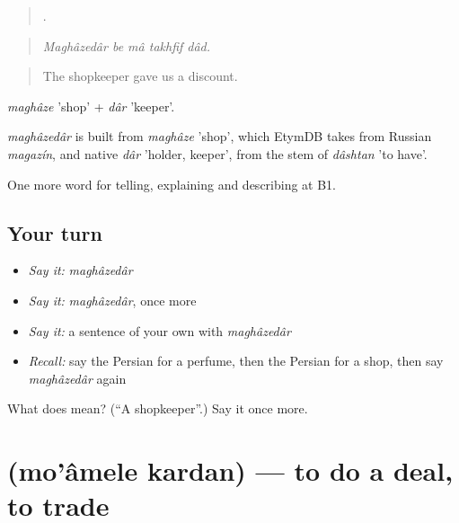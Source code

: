 \begin{quote}
     .
\end{quote}

\begin{quote}
\emph{Maghâzedâr be mâ takhfif dâd.}
\end{quote}

\begin{quote}
The shopkeeper gave us a discount.
\end{quote}

\emph{maghâze} 'shop' + \emph{dâr} 'keeper'.

\begin{cousinweb}
\emph{maghâzedâr} is built from \emph{maghâze} 'shop', which EtymDB takes from Russian \emph{magazín}, and native \emph{dâr} 'holder, keeper', from the stem of \emph{dâshtan} 'to have'.
\end{cousinweb}

\begin{grammarlens}[title={What you've built}]
One more word for telling, explaining and describing at B1.
\end{grammarlens}

\subsection*{Your turn}
\begin{itemize}
\raggedright
  \item \emph{Say it:} \emph{maghâzedâr}
  \item \emph{Say it:} \emph{maghâzedâr}, once more
  \item \emph{Say it:} a sentence of your own with \emph{maghâzedâr}
  \item \emph{Recall:} say the Persian for a perfume, then the Persian for a shop, then say \emph{maghâzedâr} again
\end{itemize}

\begin{tcolorbox}[breakable,colback=teal!4,colframe=teal!35!black,title={Before you move on}]
What does   mean? (\textquotedblleft{}A shopkeeper\textquotedblright{}.) Say it once more.
\end{tcolorbox}
\section[\texorpdfstring{\fa{معامله} \fa{کردن} (mo'âmele kardan)}{معامله کردن (mo'âmele kardan)}]{  (mo'âmele kardan) — to do a deal, to trade}

